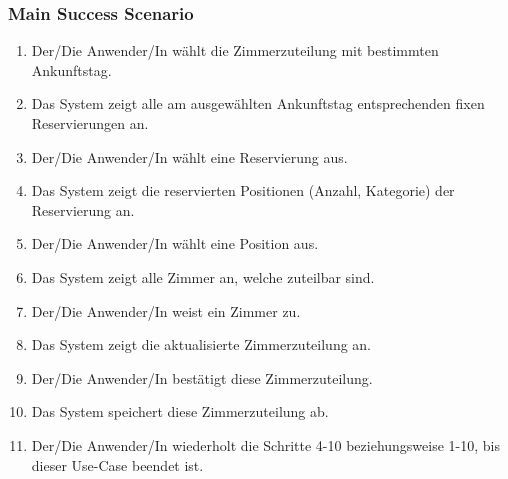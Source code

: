 \documentclass[./detailed_overview_usecases.tex]{subfiles}
\begin{document}
    \subsubsection*{Main Success Scenario}
    \begin{enumerate}
        \item Der/Die Anwender/In wählt die Zimmerzuteilung mit bestimmten Ankunftstag.
        \item Das System zeigt alle am ausgewählten Ankunftstag entsprechenden fixen Reservierungen an.
        \item Der/Die Anwender/In wählt eine Reservierung aus.
        \item Das System zeigt die reservierten Positionen (Anzahl, Kategorie) der Reservierung an.
        \item Der/Die Anwender/In wählt eine Position aus.
        \item Das System zeigt alle Zimmer an, welche zuteilbar sind.
        \item Der/Die Anwender/In weist ein Zimmer zu.
        \item Das System zeigt die aktualisierte Zimmerzuteilung an.
        \item Der/Die Anwender/In bestätigt diese Zimmerzuteilung.
        \item Das System speichert diese Zimmerzuteilung ab.
        \item Der/Die Anwender/In wiederholt die Schritte 4-10 beziehungsweise 1-10, bis dieser Use-Case beendet ist.
    \end{enumerate}
\end{document}
